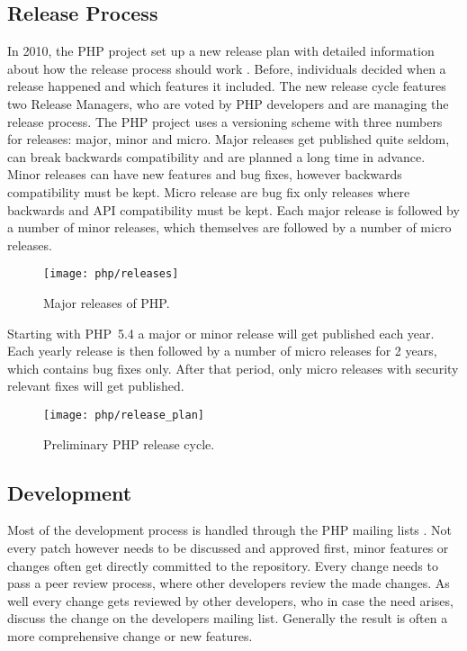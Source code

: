 
\subsection{Release Process} %

In 2010, the PHP project set up a new release plan with detailed information
about how the release process should work \cite{PHPRelease}. Before,
individuals decided when a release happened and which features it included. The
new release cycle features two Release Managers, who are voted by PHP
developers and are managing the release process. The PHP project uses a
versioning scheme with three numbers for releases: major, minor and micro.
Major releases get published quite seldom, can break backwards compatibility
and are planned a long time in advance. Minor releases can have new features
and bug fixes, however backwards compatibility must be kept. Micro release are
bug fix only releases where backwards and \ac{API} compatibility must be kept.
Each major release is followed by a number of minor releases, which themselves
are followed by a number of micro releases.

\begin{figure}[htbp]
  \centering
  \texttt{[image: php/releases]}
  \caption[Major Releases of PHP]{Major releases of PHP.}
\end{figure}

Starting with PHP~5.4 a major or minor release will get published each year.
Each yearly release is then followed by a number of micro releases for 2 years,
which contains bug fixes only. After that period, only micro releases with
security relevant fixes will get published.

\begin{figure}[htbp]
  \centering
  \texttt{[image: php/release\_plan]}
  \caption[Preliminary PHP Release Cycle]{Preliminary PHP release cycle.}
\end{figure}


\subsection{Development} %

Most of the development process is handled through the PHP mailing lists
\cite{PHPRelease,Magnusson2010,PHPVoting}. Not every patch however needs to be
discussed and approved first, minor features or changes often get directly
committed to the repository. Every change needs to pass a peer review process,
where other developers review the made changes. As well every change gets
reviewed by other developers, who in case the need arises, discuss the change
on the developers mailing list. Generally the result is often a more
comprehensive change or new features.

